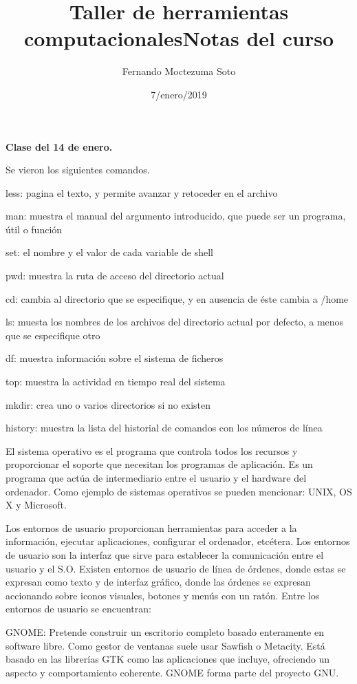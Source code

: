 \documentclass[etterpaper, 12pt, oneside]{article}%
\title{\Huge Taller de herramientas computacionales}
\author{Fernando Moctezuma Soto}
\date{7/enero/2019}
\begin{document}
	\maketitle
	
	\newpage
	
	\title{\Huge Notas del curso\\}
	
	\textbf{Clase del 14 de enero.}
	
	Se vieron los siguientes comandos. 
	
less: pagina el texto, y permite avanzar y retoceder en el archivo

man: muestra el manual del argumento introducido, que puede ser un programa, útil o función

set: el nombre y el valor de cada variable de shell

pwd: muestra la ruta de acceso del directorio actual

cd: cambia al directorio que se especifique, y en ausencia de éste cambia a /home

ls: muesta los nombres de los archivos del directorio actual por defecto, a menos que se especifique otro

df: muestra información sobre el sistema de ficheros

top: muestra la actividad en tiempo real del sistema

mkdir: crea uno o varios directorios si no existen

history: muestra la lista del historial de comandos con los números de línea

El sistema operativo es el programa que controla todos los recursos y proporcionar el soporte que necesitan los programas de aplicación. Es un programa que actúa de intermediario entre el usuario y el hardware del ordenador. Como ejemplo de sistemas operativos se pueden mencionar: UNIX, OS X y Microsoft.
		
		Los entornos de usuario proporcionan herramientas para acceder a la información, ejecutar aplicaciones, configurar el ordenador, etcétera. Los entornos de usuario son la interfaz que sirve para establecer la comunicación entre el usuario y el S.O. Existen entornos de usuario de línea de órdenes, donde estas se expresan como texto y de interfaz gráfico, donde las órdenes se expresan accionando sobre iconos visuales, botones y menús con un ratón. Entre los entornos de usuario se encuentran:
		
		 GNOME: Pretende construir un escritorio completo basado enteramente en software libre. Como gestor de ventanas suele usar Sawfish o Metacity. Está basado en las librerías GTK como las aplicaciones que incluye, ofreciendo un aspecto y comportamiento coherente. GNOME forma parte del proyecto GNU.
		 
\end{document}
